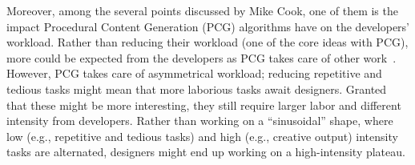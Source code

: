 Moreover, among the several points discussed by Mike Cook, one of them is the impact Procedural Content Generation (PCG) algorithms have on the developers' workload. Rather than reducing their workload (one of the core ideas with PCG), more could be expected from the developers as PCG takes care of other work~\cite{cook_social_2021}. However, PCG takes care of asymmetrical workload; reducing repetitive and tedious tasks might mean that more laborious tasks await designers. Granted that these might be more interesting, they still require larger labor and different intensity from developers. Rather than working on a ``sinusoidal'' shape, where low (e.g., repetitive and tedious tasks) and high (e.g., creative output) intensity tasks are alternated, designers might end up working on a high-intensity plateau.












